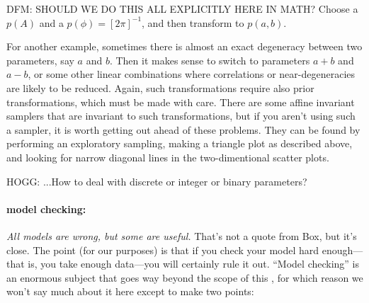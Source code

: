 \documentclass[12pt,twoside,pdftex]{article}
\begin{document}
DFM: SHOULD WE DO THIS ALL EXPLICITLY HERE IN MATH?
Choose a $p(A)$ and a $p(\phi) = [2\pi]^{-1}$,
   and then transform to $p(a, b)$.


For another example, sometimes there is almost an exact degeneracy between two parameters,
  say $a$ and $b$.  Then it makes sense to switch to parameters $a+b$ and $a-b$,
  or some other linear combinations where correlations or near-degeneracies are likely to be reduced.
Again, such transformations require also prior transformations, which must be made with care.
There are some affine invariant samplers that are invariant to such transformations,
  but if you aren't using such a sampler,
  it is worth getting out ahead of these problems.
They can be found by performing an exploratory sampling,
  making a triangle plot as described above,
  and looking for narrow diagonal lines in the two-dimentional scatter plots.

HOGG: ...How to deal with discrete or integer or binary parameters?

\paragraph{model checking:}
\emph{All models are wrong, but some are useful.}
That's not a quote from Box, but it's close.
The point (for our purposes) is that if you check your model hard
enough---that is, you take enough data---you will certainly rule it
out.
``Model checking'' is an enormous subject that goes way beyond the
scope of this \documentname, for which reason we won't say much about
it here except to make two points:
\end{document}
